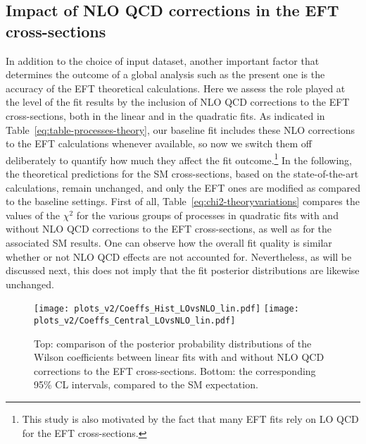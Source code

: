 \clearpage
\subsection{Impact of NLO QCD corrections in the EFT cross-sections}
\label{subsec:loqcd}

In addition to the choice of input dataset, another important
factor that determines the outcome of a global analysis
such as the present one is the  accuracy
of the EFT theoretical calculations.
%
Here we assess the role played at the level of the fit results
by the inclusion of NLO QCD corrections to the EFT cross-sections,
both in the linear and in the quadratic fits.
%
As indicated in Table~\ref{eq:table-processes-theory},
our baseline fit includes these NLO corrections
to the EFT calculations whenever available, so now we switch them off deliberately
to quantify how much they affect the fit outcome.\footnote{This study
  is also motivated by the fact that many EFT fits
rely on LO QCD for the EFT cross-sections.}
%
In the following, the theoretical predictions
for the SM cross-sections, based on the state-of-the-art calculations,
remain unchanged, and only the EFT ones are modified as compared to the baseline
settings.
%
First of all, Table~\ref{eq:chi2-theoryvariations}
compares the values of the $\chi^2$ for the various groups of processes
in quadratic fits with and without NLO QCD corrections to  the  EFT cross-sections,
as well as for the associated SM results.
%
One can observe how the overall fit quality
is similar whether or not NLO QCD effects are not accounted for.
%
Nevertheless, as will be discussed next, this does
not imply that the fit posterior distributions
are likewise unchanged.



\begin{figure}[htbp]
  \begin{center}
    \texttt{[image: plots\_v2/Coeffs\_Hist\_LOvsNLO\_lin.pdf]}
    \texttt{[image: plots\_v2/Coeffs\_Central\_LOvsNLO\_lin.pdf]}
    \caption{\small Top: comparison of the posterior probability
      distributions of the Wilson coefficients
      between linear fits with and without NLO QCD corrections to the EFT cross-sections.
      Bottom: the corresponding 95\% CL intervals, compared to the SM expectation.
     \label{fig:posterior-distributions-NLO-vs-LO-linear} }
  \end{center}
\end{figure}

